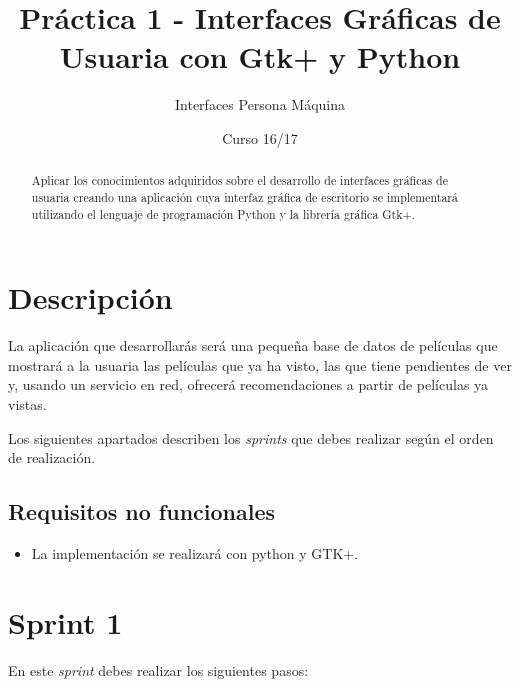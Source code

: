 \documentclass[11pt,a4paper]{article}
\title{Práctica 1 - Interfaces Gráficas de Usuaria con Gtk+ y Python}
\author{Interfaces Persona Máquina}
\date{Curso 16/17}
\begin{document}
\maketitle

\begin{abstract}
  Aplicar los conocimientos adquiridos sobre el desarrollo de
  interfaces gráficas de usuaria creando una aplicación cuya interfaz
  gráfica de escritorio se implementará utilizando el lenguaje de
  programación Python y la librería gráfica Gtk+.
\end{abstract}


\section{Descripción}

La aplicación que desarrollarás será una pequeña base de datos de películas
que mostrará a la usuaria las películas que ya ha visto, las que tiene
pendientes de ver y, usando un servicio en red, ofrecerá recomendaciones
a partir de películas ya vistas.

Los siguientes apartados describen los \emph{sprints} que debes
realizar según el orden de realización.


\subsection{Requisitos no funcionales}
\begin{itemize}
\item La implementación se realizará con python y GTK+.
\end{itemize}


\section{Sprint 1}

En este \emph{sprint} debes realizar los siguientes pasos:
\end{document}
